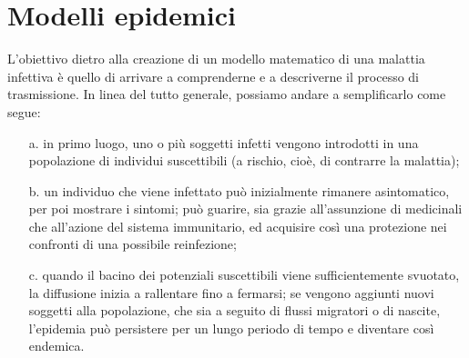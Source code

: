\chapter{Modelli epidemici}
\label{chap:cap1}
L'obiettivo dietro alla creazione di un modello matematico di una malattia infettiva è quello di arrivare a comprenderne e a descriverne il processo di trasmissione. In linea del tutto generale, possiamo andare a semplificarlo come segue:
\begin{enumerate}
\item[a.] in primo luogo, uno o più soggetti infetti vengono introdotti in una popolazione di individui suscettibili (a rischio, cioè, di contrarre la malattia);
\item[b.] un individuo che viene infettato può inizialmente rimanere asintomatico, per poi mostrare i sintomi; può guarire, sia grazie all'assunzione di medicinali che all'azione del sistema immunitario, ed acquisire così una protezione nei confronti di una possibile reinfezione;
\item[c.] quando il bacino dei potenziali suscettibili viene sufficientemente svuotato, la diffusione inizia a rallentare fino a fermarsi; se vengono aggiunti nuovi soggetti alla popolazione, che sia a seguito di flussi migratori o di nascite, l'epidemia può persistere per un lungo periodo di tempo e diventare così endemica. \\
\end{enumerate}
